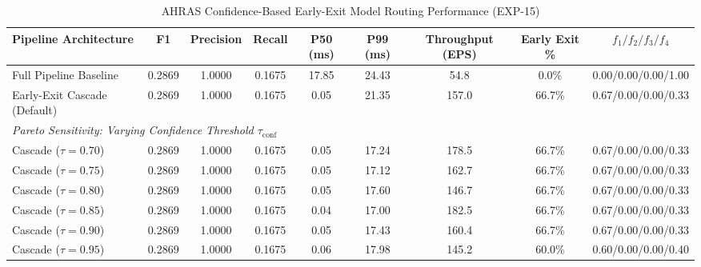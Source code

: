 \begin{table}[t]
\centering
\small
\caption{AHRAS Confidence-Based Early-Exit Model Routing Performance (EXP-15)}
\label{tab:early_exit_routing_eval}
\begin{tabular}{lcccccccc}
\toprule
\textbf{Pipeline Architecture} & \textbf{F1} & \textbf{Precision} & \textbf{Recall} & \textbf{P50 (ms)} & \textbf{P99 (ms)} & \textbf{Throughput (EPS)} & \textbf{Early Exit \%} & $f_1 / f_2 / f_3 / f_4$ \\
\midrule
Full Pipeline Baseline & 0.2869 & 1.0000 & 0.1675 & 17.85 & 24.43 & 54.8 & 0.0\% & 0.00/0.00/0.00/1.00 \\
Early-Exit Cascade (Default) & 0.2869 & 1.0000 & 0.1675 & 0.05 & 21.35 & 157.0 & 66.7\% & 0.67/0.00/0.00/0.33 \\
\midrule
\multicolumn{9}{l}{\textit{Pareto Sensitivity: Varying Confidence Threshold $\tau_{\mathrm{conf}}$}} \\
Cascade ($\tau=0.70$) & 0.2869 & 1.0000 & 0.1675 & 0.05 & 17.24 & 178.5 & 66.7\% & 0.67/0.00/0.00/0.33 \\
Cascade ($\tau=0.75$) & 0.2869 & 1.0000 & 0.1675 & 0.05 & 17.12 & 162.7 & 66.7\% & 0.67/0.00/0.00/0.33 \\
Cascade ($\tau=0.80$) & 0.2869 & 1.0000 & 0.1675 & 0.05 & 17.60 & 146.7 & 66.7\% & 0.67/0.00/0.00/0.33 \\
Cascade ($\tau=0.85$) & 0.2869 & 1.0000 & 0.1675 & 0.04 & 17.00 & 182.5 & 66.7\% & 0.67/0.00/0.00/0.33 \\
Cascade ($\tau=0.90$) & 0.2869 & 1.0000 & 0.1675 & 0.05 & 17.43 & 160.4 & 66.7\% & 0.67/0.00/0.00/0.33 \\
Cascade ($\tau=0.95$) & 0.2869 & 1.0000 & 0.1675 & 0.06 & 17.98 & 145.2 & 60.0\% & 0.60/0.00/0.00/0.40 \\
\bottomrule
\end{tabular}
\end{table}
